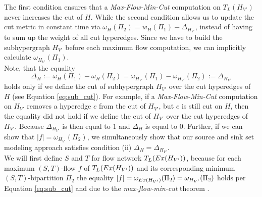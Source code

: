 The first condition ensures that a \emph{Max-Flow-Min-Cut} computation on $T_L(H_{V'})$ never 
increases the cut of $H$. While the second condition allows us to update the cut metric in
constant time via $\omega_H(\Pi_2) = w_H(\Pi_1) - \Delta_{H_{V'}}$, instead of having 
to sum up the weight of all cut hyperedges. Since we have to build the subhypergraph
$H_{V'}$ before each maximum flow computation, we can implicitly calculate $\omega_{H_{V'}}(\Pi_1)$.\\
Note, that the equality
\[\Delta_{H} := \omega_H(\Pi_1) - \omega_H(\Pi_2) = \omega_{H_{V'}}(\Pi_1) - \omega_{H_{V'}}(\Pi_2) := \Delta_{H_{V'}}\]
holds only if we define the cut of subhypergraph $H_{V'}$ over the cut hyperedges of $H$
(see Equation \ref{eq:sub_cut}). For example, if a \emph{Max-Flow-Min-Cut} computation
on $H_{V'}$ removes a hyperedge $e$ from the cut of $H_{V'}$, but $e$ is still cut on
$H$, then the equality did not hold if we define the cut of $H_{V'}$ over the cut
hyperedges of $H_{V'}$. Because $\Delta_{H_{V'}}$ is then equal to $1$ and $\Delta_{H}$
is equal to $0$. Further, if we can show that $|f| = \omega_{H_{V'}}(\Pi_2)$, we simultaneously show
that our source and sink set modeling approach satisfies condition (ii) 
$\Delta_H = \Delta_{H_{V'}}$. \\
We will first define $S$ and $T$ for flow network
$T_L(Ex(H_{V'}))$, because for each maximum $(S,T)$-flow $f$ of $T_L(Ex(H_{V'}))$
and its corresponding minimum $(S,T)$-bipartition $\Pi_2$ the equality 
$|f| = \omega_{Ex(H_{V'})}(\Pi_2) = \omega_{H_{V'}}(\Pi_2)$ holds per Equation
\ref{eq:sub_cut} and due to the \emph{max-flow-min-cut} theorem \cite{ford1956maximal}. 
